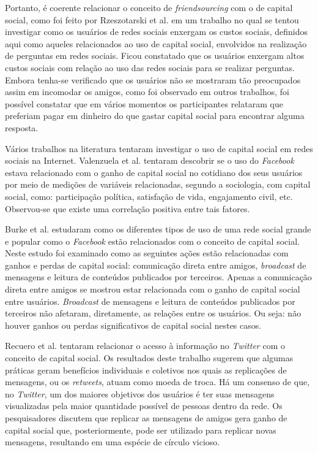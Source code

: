 Portanto, é coerente relacionar o conceito de \textit{friendsourcing} com o de capital social, como foi feito por Rzeszotarski et al. \cite{rzeszotarski2014estimating} em um trabalho no qual se tentou investigar como os usuários de redes sociais enxergam os custos sociais, definidos aqui como aqueles relacionados ao uso de capital social, envolvidos na realização de perguntas em redes sociais. Ficou constatado que os usuários enxergam altos custos sociais com relação ao uso das redes sociais para se realizar perguntas. Embora tenha-se verificado que os usuários não se mostraram tão preocupados assim em incomodar os amigos, como foi observado em outros trabalhos, foi possível constatar que em vários momentos os participantes relataram que preferiam pagar em dinheiro do que gastar capital social para encontrar alguma resposta.   

Vários trabalhos na literatura tentaram investigar o uso de capital social em redes sociais na Internet. Valenzuela et al. \cite{valenzuela2009there} tentaram descobrir se o uso do \textit{Facebook} estava relacionado com o ganho de capital social no cotidiano dos seus usuários por meio de medições de variáveis relacionadas, segundo a sociologia, com capital social, como: participação política, satisfação de vida, engajamento civil, etc. Observou-se que existe uma correlação positiva entre tais fatores.

Burke et al. \cite{Burke:2011:SCF:1978942.1979023} estudaram como os diferentes tipos de uso de uma rede social grande e popular como o \textit{Facebook} estão relacionados com o conceito de capital social. Neste estudo foi examinado como as seguintes ações estão relacionadas com ganhos e perdas de capital social: comunicação direta entre amigos, \textit{broadcast} de mensagens e leitura de conteúdos publicados por terceiros. Apenas a comunicação direta entre amigos se mostrou estar relacionada com o ganho de capital social entre usuários. \textit{Broadcast} de mensagens e leitura de conteúdos publicados por terceiros não afetaram, diretamente, as relações entre os usuários. Ou seja: não houver ganhos ou perdas significativos de capital social nestes casos.

Recuero et al. \cite{recuero2012economia} tentaram relacionar o acesso à informação no \textit{Twitter} com o conceito de capital social. Os resultados deste trabalho sugerem que algumas práticas geram benefícios individuais e coletivos nos quais as replicações de mensagens, ou os \textit{retweets}, atuam como moeda de troca. Há um consenso de que, no \textit{Twitter}, um dos maiores objetivos dos usuários é ter suas mensagens visualizadas pela maior quantidade possível de pessoas dentro da rede. Os pesquisadores discutem que replicar as mensagens de amigos gera ganho de capital social que, posteriormente, pode ser utilizado para replicar novas mensagens, resultando em uma espécie de círculo vicioso.

